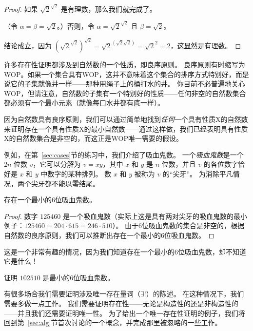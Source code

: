 \begin{proof}
      如果 $\sqrt{2}^{\sqrt{2}}$ 是有理数，那么我们就完成了。   

      （令 $ \alpha = \beta = \sqrt{2}$。）否则，令 $\alpha = \sqrt{2}^{\sqrt{2}}$ 且 $\beta = \sqrt{2}$。
      
      结论成立，因为 $\left(\sqrt{2}^{\sqrt{2}}\right)^{\sqrt{2}} = \sqrt{2}^{(\sqrt{2}\sqrt{2})} = \sqrt{2}^2 = 2$，这显然是有理数。
\end{proof}

许多存在性证明都涉及到自然数的一个性质，即良序原则。
良序原则有时缩写为WOP。如果一个集合具有WOP，这并不意味着这个集合的排序方式特别好，而是说它的子集就像井一样——那种用绳子上的桶打水的井。
你目前不必普遍地关心WOP，但请注意，自然数的子集有一个特别好的性质——任何非空的自然数集合都必须有一个最小元素（就像每口水井都有底一样）。

因为自然数具有良序原则，我们可以通过简单地找到\emph{任何}一个具有性质X的自然数来证明存在一个具有性质X的最小自然数——通过这样做，我们已经表明具有性质X的自然数集合是非空的，而这正是WOP唯一需要的假设。

例如，在第~\ref{sec:cases}节的练习中，我们介绍了吸血鬼数。
一个\emph{吸血鬼数}是一个 $2n$ 位数 $v$，它可以分解为 $v=xy$，其中 $x$ 和 $y$ 是 $n$ 位数，并且 $v$ 的各位数字恰好是 $x$ 和 $y$ 中数字的某种排列。
数 $x$ 和 $y$ 被称为 $v$ 的“尖牙”。
为消除平凡情况，两个尖牙都不能以零结尾。

\begin{thm}
      存在一个最小的6位吸血鬼数。
\end{thm}

\begin{proof}     
      数字 $125460$ 是一个吸血鬼数（实际上这是具有两对尖牙的吸血鬼数的最小例子：$125460 = 204\cdot 615 = 246\cdot 510$）。
      由于6位吸血鬼数的集合是非空的，根据自然数的良序原则，我们可以推断出存在一个最小的6位吸血鬼数。
\end{proof}

这是一个非常有趣的情况，因为我们知道存在一个最小的6位吸血鬼数，却不知道它是什么！

\begin{exer}
      证明 $102510$ 是最小的6位吸血鬼数。
\end{exer}

有很多场合我们需要证明涉及唯一存在量词（$\exists !$）的陈述。
在这种情况下，我们需要多做一点工作。
我们需要证明存在性——无论是构造性的还是非构造性的——并且我们还需要证明唯一性。
为了给出一个唯一存在性证明的例子，我们将回到第~\ref{sec:alg}节首次讨论的一个概念，并完成那里被忽略的一些工作。

